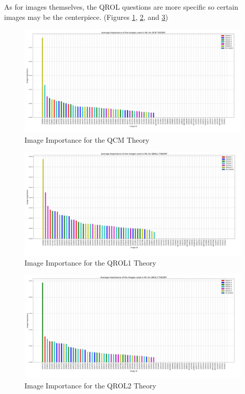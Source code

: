 \documentclass[a4paper,11pt]{report}
\numberwithin{figure}{section} %
\begin{document}
    As for images themselves, the QROL questions are more specific so certain images may be the centerpiece. (Figures \ref{fig:im_th1}, \ref{fig:im_th2}, and \ref{fig:im_th3})

     \begin{figure}[H]
      \centering
      \includegraphics[width=.95\linewidth]{plots/im_importance_QCM_THEORY_2018-05-02_20_53_22.png}
      \caption{Image Importance for the QCM Theory}
      \label{fig:im_th1}
      \end{figure}
      
      \begin{figure}[H]
      \centering
      \includegraphics[width=.95\linewidth]{plots/im_importance_QROL1_THEORY_2018-05-02_20_54_25.png}
      \caption{Image Importance for the QROL1 Theory}
      \label{fig:im_th2}
      \end{figure}
      
      \begin{figure}[H]
      \centering
      \includegraphics[width=.95\linewidth]{plots/im_importance_QROL2_THEORY_2018-05-02_20_53_48.png}
      \caption{Image Importance for the QROL2 Theory}
      \label{fig:im_th3}
      \end{figure}    
\end{document}
